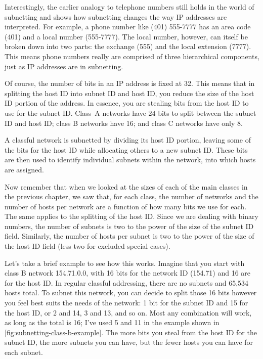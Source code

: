 Interestingly, the earlier analogy to telephone numbers still holds in
the world of subnetting and shows how subnetting changes the way IP
addresses are interpreted. For example, a phone number like (401)
555-7777 has an area code (401) and a local number (555-7777). The local
number, however, can itself be broken down into two parts: the exchange
(555) and the local extension (7777). This means phone numbers really
are comprised of three hierarchical components, just as IP addresses are
in subnetting.

Of course, the number of bits in an IP address is fixed at 32.
This means that in splitting the host ID into subnet ID and host ID, you reduce the size of the host ID portion of the address.
In essence, you are stealing bits from the host ID to use for the subnet ID.
Class~A networks have 24 bits to split between the subnet ID and host ID; class B networks have 16; and class C networks have only 8.


\begin{keyconcept}
A classful network is subnetted by dividing its
host ID portion, leaving some of the bits for the host ID while
allocating others to a new subnet ID. These bits are then used to
identify individual subnets within the network, into which hosts are
assigned.
\end{keyconcept}

Now remember that when we looked at the sizes of each of the main
classes in the previous chapter, we saw that, for each class, the number
of networks and the number of hosts per network are a function of how
many bits we use for each. The same applies to the splitting of the host
ID. Since we are dealing with binary numbers, the number of subnets is
two to the power of the size of the subnet ID field. Similarly, the
number of hosts per subnet is two to the power of the size of the host
ID field (less two for excluded special cases).

Let's take a brief example to see how this works. Imagine that you start
with class B network 154.71.0.0, with 16 bits for the network ID
(154.71) and 16 are for the host ID. In regular classful addressing,
there are no subnets and 65,534 hosts total. To subnet this network, you
can decide to split those 16 bits however you feel best suits the needs
of the network: 1 bit for the subnet ID and 15 for the host ID, or 2 and
14, 3 and 13, and so on. Most any combination will work, as long as the total is 16;
I've used 5 and 11 in the example shown in \cref{fig:subnetting-class-b-example}.
The more bits you steal from the host ID for the subnet ID, the more subnets you can have, but the fewer hosts you can have for each subnet.


